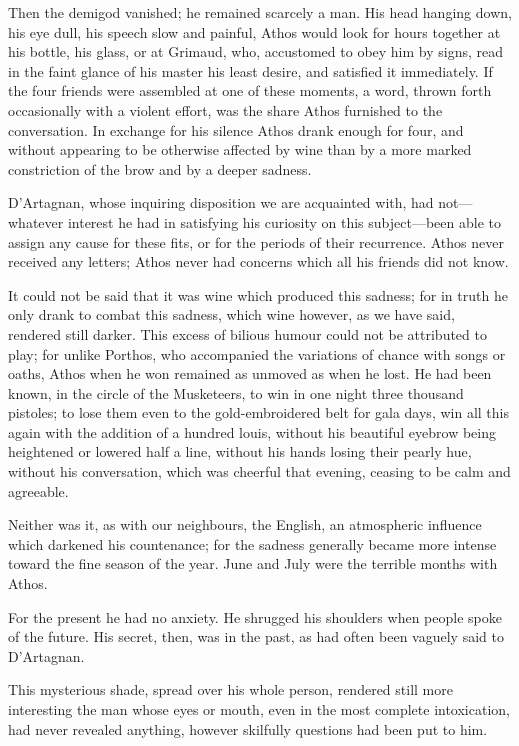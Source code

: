 Then the demigod vanished; he remained scarcely a man. His head hanging down, his eye dull, his speech slow and painful, Athos would look for hours together at his bottle, his glass, or at Grimaud, who, accustomed to obey him by signs, read in the faint glance of his master his least desire, and satisfied it immediately. If the four friends were assembled at one of these moments, a word, thrown forth occasionally with a violent effort, was the share Athos furnished to the conversation. In exchange for his silence Athos drank enough for four, and without appearing to be otherwise affected by wine than by a more marked constriction of the brow and by a deeper sadness. 

D'Artagnan, whose inquiring disposition we are acquainted with, had not—whatever interest he had in satisfying his curiosity on this subject—been able to assign any cause for these fits, or for the periods of their recurrence. Athos never received any letters; Athos never had concerns which all his friends did not know. 

It could not be said that it was wine which produced this sadness; for in truth he only drank to combat this sadness, which wine however, as we have said, rendered still darker. This excess of bilious humour could not be attributed to play; for unlike Porthos, who accompanied the variations of chance with songs or oaths, Athos when he won remained as unmoved as when he lost. He had been known, in the circle of the Musketeers, to win in one night three thousand pistoles; to lose them even to the gold-embroidered belt for gala days, win all this again with the addition of a hundred louis, without his beautiful eyebrow being heightened or lowered half a line, without his hands losing their pearly hue, without his conversation, which was cheerful that evening, ceasing to be calm and agreeable. 

Neither was it, as with our neighbours, the English, an atmospheric influence which darkened his countenance; for the sadness generally became more intense toward the fine season of the year. June and July were the terrible months with Athos. 

For the present he had no anxiety. He shrugged his shoulders when people spoke of the future. His secret, then, was in the past, as had often been vaguely said to D'Artagnan. 

This mysterious shade, spread over his whole person, rendered still more interesting the man whose eyes or mouth, even in the most complete intoxication, had never revealed anything, however skilfully questions had been put to him. 


